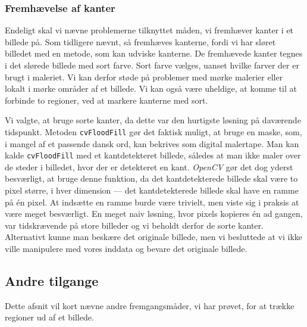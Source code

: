 {\subsubsection{Fremhævelse af kanter}
Endeligt skal vi nævne problemerne tilknyttet måden, vi fremhæver kanter
i et billede på. Som tidligere nævnt, så fremhæves kanterne, fordi vi
har sløret billedet med en metode, som kan udviske kanterne. De
fremhævede kanter tegnes i det slørede billede med sort farve.  Sort
farve vælges, uanset hvilke farver der er brugt i maleriet. Vi kan
derfor støde på problemer med mørke malerier eller lokalt i mørke
områder af et billede. Vi kan også være uheldige, at komme til at
forbinde to regioner, ved at markere kanterne med sort.

Vi valgte, at bruge sorte kanter, da dette var den hurtigste løsning på
daværende tidspunkt. Metoden \texttt{cvFloodFill} gør det faktisk
muligt, at bruge en maske, som, i mangel af et passende dansk ord, kan
bekrives som digital malertape. Man kan kalde \texttt{cvFloodFill} med
et kantdetekteret billede, således at man ikke maler over de steder i
billedet, hvor der er detekteret en kant. \emph{OpenCV} gør det dog
yderst besværligt, at bruge denne funktion, da det kantdetekterede
billede skal være to pixel større, i hver dimension --- det
kantdetekterede billede skal have en ramme på én pixel. At indsætte en
ramme burde være trivielt, men viste sig i praksis at være meget
besværligt. En meget naiv løsning, hvor pixels kopieres én ad gangen,
var tidskrævende på store billeder og vi beholdt derfor de sorte kanter.
Alternativt kunne man beskære det originale billede, men vi besluttede
at vi ikke ville manipulere med vores inddata og bevare det originale
billede.

%
%
%
%
%
%

\subsection{Andre tilgange}
Dette afsnit vil kort nævne andre fremgangsmåder, vi har prøvet, for at
trække regioner ud af et billede.

}

